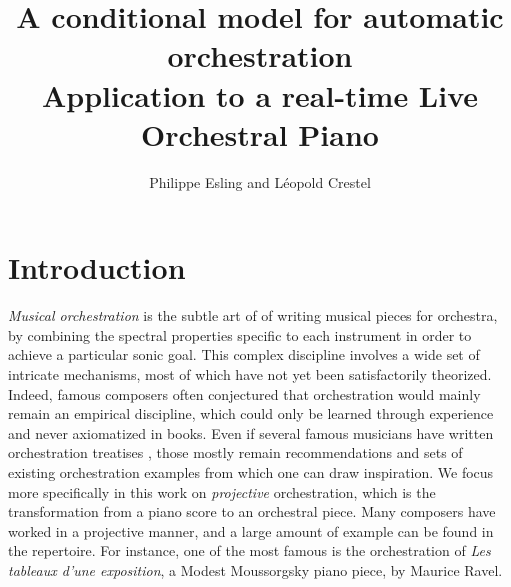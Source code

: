 \documentclass{article} %
\begin{document}

\title{A conditional model for automatic orchestration\\Application to a real-time Live Orchestral Piano} %
\author{Philippe Esling and Léopold Crestel}

\maketitle

\begin{abstract}

\end{abstract}

\section{Introduction}
\textit{Musical orchestration} is the subtle art of of writing musical pieces for orchestra, by combining the spectral properties specific to each instrument in order to achieve a particular sonic goal. This complex discipline involves a wide set of intricate mechanisms, most of which have not yet been satisfactorily theorized. Indeed, famous composers often conjectured that orchestration would mainly remain an empirical discipline, which could only be learned through experience and never axiomatized in books. Even if several famous musicians have written orchestration treatises \cite{berlioz_orch,koechli_orch}, those mostly remain recommendations and sets of existing orchestration examples from which one can draw inspiration.
We focus more specifically in this work on \textit{projective} orchestration, which is the transformation from a piano score to an orchestral piece. Many composers have worked in a projective manner, and a large amount of example can be found in the repertoire. For instance, one of the most famous is the orchestration of \textit{Les tableaux d'une exposition}, a Modest Moussorgsky piano piece, by Maurice Ravel.
\end{document}
